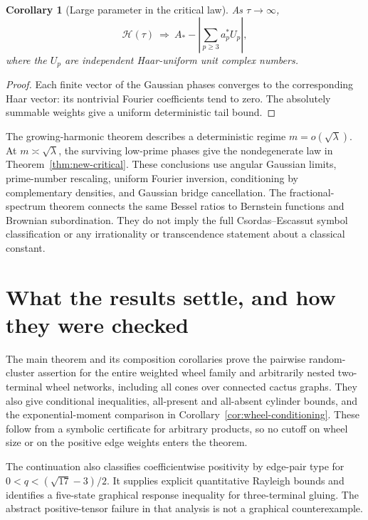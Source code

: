 \documentclass[11pt,a4paper]{article}
\newtheorem{corollary}[theorem]{Corollary}
\theoremstyle{definition}
\theoremstyle{remark}\newtheorem{remark}[theorem]{Remark}
\begin{document}
\begin{corollary}[Large parameter in the critical law]
As $\tau\to\infty$,
\[
 \mathcal H(\tau)\ \Longrightarrow\
 A_*-\left|\sum_{p\geq3}a_p^*U_p\right|,
\]
where the $U_p$ are independent Haar-uniform unit complex numbers.
\end{corollary}

\begin{proof}
Each finite vector of the Gaussian phases converges to the corresponding
Haar vector: its nontrivial Fourier coefficients tend to zero.  The
absolutely summable weights give a uniform deterministic tail bound.
\end{proof}

The growing-harmonic theorem describes a deterministic regime
$m=o(\sqrt\lambda)$.  At $m\asymp\sqrt\lambda$, the surviving low-prime
phases give the nondegenerate law in Theorem~\ref{thm:new-critical}.
These conclusions use angular Gaussian limits, prime-number rescaling,
uniform Fourier inversion, conditioning by complementary densities, and
Gaussian bridge cancellation.  The fractional-spectrum theorem connects
the same Bessel ratios to Bernstein functions and Brownian subordination.
They do not imply the full Csordas--Escassut symbol classification or any
irrationality or transcendence statement about a classical constant.


\clearpage
\section{What the results settle, and how they were checked}
\label{sec:status}

The main theorem and its composition corollaries prove the pairwise
random-cluster assertion for the entire weighted wheel family and
arbitrarily nested two-terminal wheel networks, including all cones
over connected cactus graphs. They also give conditional inequalities,
all-present and all-absent cylinder bounds, and the exponential-moment
comparison in Corollary~\ref{cor:wheel-conditioning}. These follow from a
symbolic certificate for arbitrary products, so no cutoff on wheel size
or on the positive edge weights enters the theorem.

The continuation also classifies coefficientwise positivity by edge-pair
type for $0<q<(\sqrt{17}-3)/2$. It supplies explicit quantitative
Rayleigh bounds and identifies a five-state graphical response
inequality for three-terminal gluing. The abstract positive-tensor
failure in that analysis is not a graphical counterexample.
\end{document}
